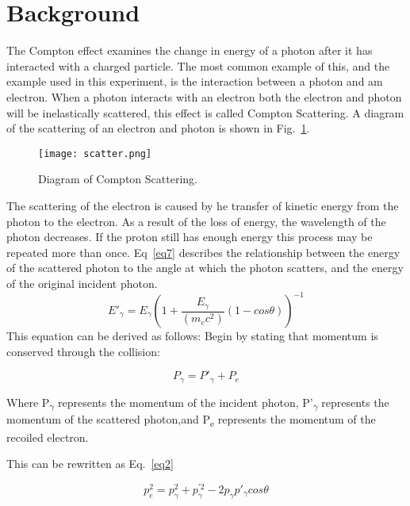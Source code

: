 \documentclass[prb,preprint,groupaddress,showpacs,superbib,floats]{revtex4-1}
\begin{document}
\section{Background}
The Compton effect examines the change in energy of a photon after it has interacted with a charged particle. The most common example of this, and the example used in this experiment, is the interaction between a photon and am electron. When a photon interacts with an electron both the electron and photon will be inelastically scattered, this effect is called Compton Scattering. A diagram of the scattering of an electron and photon is shown in Fig.~\ref{scatter}. 
%
\begin{figure}[h]
	\centering
	\texttt{[image: scatter.png]}
	\caption{Diagram of Compton Scattering.}
	\label{scatter}
\end{figure}
The scattering of the electron is caused by he transfer of kinetic energy from the photon to the electron. As a result of the loss of energy, the wavelength of the photon decreases. If the proton still has enough energy this process may be repeated more than once. 
Eq~\ref{eq7} describes the relationship between the energy of the scattered photon to the angle at which the photon scatters, and the energy of the original incident photon.
\begin{equation}\label{eq7}
E'_\gamma= E_\gamma(1+\frac{E_\gamma}{(m_e c^2 )} (1-cos \theta))^{-1}
\end{equation}
This equation can be derived as follows:
Begin by stating that momentum is conserved through the collision:

\begin{equation}\label{eq1}
P_\gamma= P'_\gamma+P_e
\end{equation}

Where P\textsubscript{$\gamma$}  represents the momentum of the incident photon, P'\textsubscript{$\gamma$} represents the momentum of 
the scattered photon,and P\textsubscript{e}  represents the momentum of the recoiled electron.   

This can be rewritten as Eq.~\ref{eq2}

\begin{equation}\label{eq2}
p_e^2=p_\gamma^2+p_\gamma^{'2} - 2 p_\gamma p'_\gamma cos\theta
\end{equation}
\end{document}
